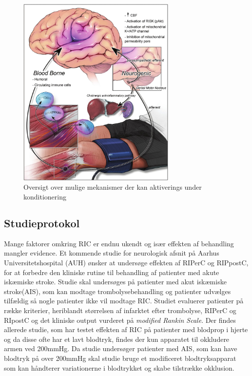 \begin{figure}[H]
	\centering
	\includegraphics[width = 0.7\textwidth]{billeder/Konditioneringsmekanismer.png}
	\caption{Oversigt over mulige mekanismer der kan aktiverings under konditionering} \label{fig:mechanism}
\end{figure}

\subsection{Studieprotokol}

Mange faktorer omkring RIC er endnu ukendt og især effekten af behandling mangler evidence. Et kommende studie for neurologisk afsnit på Aarhus Universitetshospital (AUH) ønsker at undersøge effekten af RIPerC og RIPpostC, for at forbedre den kliniske rutine til behandling af patienter med akute iskæmiske stroke.  Studie skal undersøges på patienter med akut iskæmiske stroke(AIS), som kan modtage trombolysebehandling og patienter udvælges tilfældig så nogle patienter ikke vil modtage RIC. Studiet evaluerer patienter på række kriterier, heriblandt størrelsen af infarktet efter trombolyse, RIPerC og RIpostC og det kliniske output vurderet på \textit{modified Rankin Scale}. Der findes allerede studie, som har testet effekten af RIC på patienter med blodprop i hjerte og da disse ofte har et lavt blodtryk, findes der kun apparatet til okkludere armen ved 200mmHg. Da studie undersøger patienter med AIS, som kan have blodtryk på over 200mmHg skal studie bruge et modificeret blodtryksapparat som kan håndterer variationerne i blodtrykket og skabe tilstrække okklusion.

